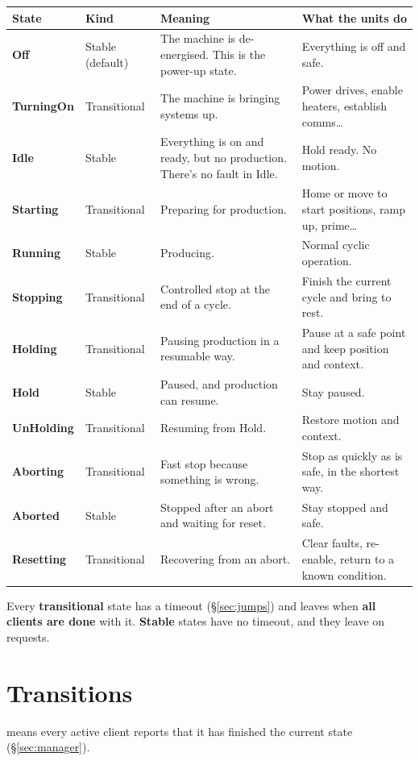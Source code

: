 \documentclass[11pt,a4paper]{report}
\DeclareRobustCommand{\code}[1]{\texttt{\detokenize{#1}}}
\newcommand{\st}[1]{\textbf{#1}}                  %
\begin{document}
\begin{xltabular}{\linewidth}{P{2.2cm} P{2.1cm} L L}
\toprule
\textbf{State} & \textbf{Kind} & \textbf{Meaning} & \textbf{What the units do} \\
\midrule
\endhead
\st{Off} & Stable (default) & The machine is de-energised. This is the power-up state. & Everything is off and safe. \\
\st{TurningOn} & Transitional & The machine is bringing systems up. & Power drives, enable heaters, establish comms\ldots \\
\st{Idle} & Stable & Everything is on and ready, but no production. There's no fault in Idle. & Hold ready. No motion. \\
\st{Starting} & Transitional & Preparing for production. & Home or move to start positions, ramp up, prime\ldots \\
\st{Running} & Stable & Producing. & Normal cyclic operation. \\
\st{Stopping} & Transitional & Controlled stop at the end of a cycle. & Finish the current cycle and bring to rest. \\
\st{Holding} & Transitional & Pausing production in a resumable way. & Pause at a safe point and keep position and context. \\
\st{Hold} & Stable & Paused, and production can resume. & Stay paused. \\
\st{UnHolding} & Transitional & Resuming from Hold. & Restore motion and context. \\
\st{Aborting} & Transitional & Fast stop because something is wrong. & Stop as quickly as is safe, in the shortest way. \\
\st{Aborted} & Stable & Stopped after an abort and waiting for reset. & Stay stopped and safe. \\
\st{Resetting} & Transitional & Recovering from an abort. & Clear faults, re-enable, return to a known condition. \\
\bottomrule
\end{xltabular}

Every \textbf{transitional} state has a timeout (\S\ref{sec:jumps}) and leaves when
\textbf{all clients are done} with it. \textbf{Stable} states have no timeout, and they leave
on requests.

\section{Transitions}

\code{AllDone} means every active client reports that it has finished the current state
(\S\ref{sec:manager}).
\end{document}
